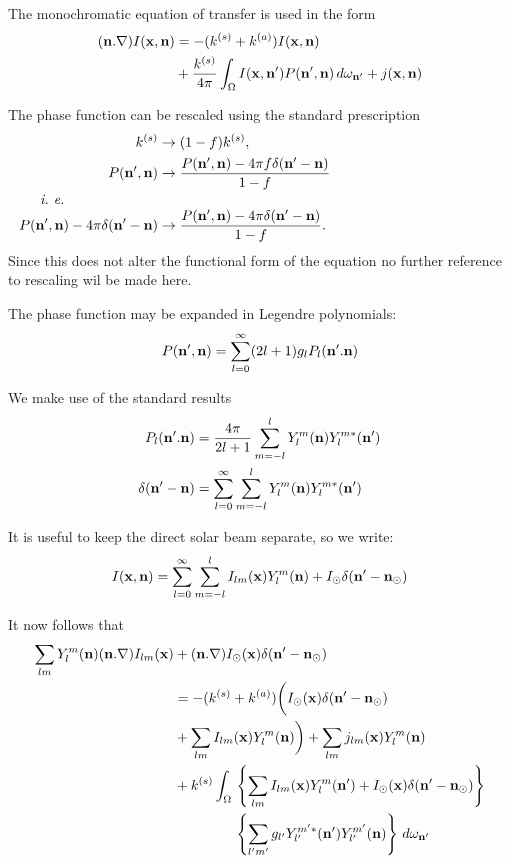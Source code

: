
The monochromatic equation of transfer is used in the form
\begin{equation}
\begin{split}
(\mathbf{n} . \nabla) I(\mathbf{x}, \mathbf{n}) & = -(k^{(s)} + k^{(a)}) I (\mathbf{x}, \mathbf{n}) \\
& + { k^{(s)} \over
{4 \pi} } \int_{\Omega} I(\mathbf{x},\mathbf{n}') P(\mathbf{n}', \mathbf{n}) \, d\omega_{\mathbf{n}'} 
+ j(\mathbf{x},\mathbf{n})
\end{split}
\end{equation}

The phase function can be rescaled using the standard prescription
\begin{align}
k^{(s)} & \rightarrow (1-f) k^{(s)}, \\
P(\bnp, \bn) & \rightarrow { {P(\bnp, \bn)-4\pi f \delta(\bnp - \bn)}
\over {1-f}} \\
\noalign{\text{\it i.~e.}}
P(\bnp, \bn)-4\pi \delta(\bnp - \bn) & \rightarrow 
{ {P(\bnp, \bn)-4\pi \delta(\bnp - \bn)}
\over {1-f}}.
\end{align}
Since this does not alter the functional form of the equation no further 
reference to rescaling wil be made here.

The phase function may be expanded in Legendre polynomials:
\begin{equation}
P(\mathbf{n}', \mathbf{n})= \sum_{l=0}^\infty (2l+1) g_l P_l (\mathbf{n}'.\mathbf{n})
\end{equation}

We make use of the standard results
\begin{align}
P_l (\mathbf{n}'.\mathbf{n}) &= { 4\pi \over {2l+1} } \sum_{m=-l}^l Y_l^m (\mathbf{n}) Y_l^{m*}
(\mathbf{n}') \\
\delta(\mathbf{n}' - \mathbf{n}) &= \sum_{l=0}^\infty \sum_{m=-l}^l Y_l^m (\mathbf{n}) Y_l^{m*}
(\mathbf{n}')
\end{align}

It is useful to keep the direct solar beam separate, so we write:
\begin{equation}
I(\mathbf{x},\mathbf{n}) = \sum_{l=0}^\infty \sum_{m=-l}^l I_{lm}(\mathbf{x}) Y_l^m (\mathbf{n})
+ I_\odot \delta(\mathbf{n}' - \mathbf{n}_\odot)
\end{equation}

It now follows that
\begin{equation}
\begin{split}
\sum_{lm} Y_l^m (\mathbf{n}) (\mathbf{n} . \nabla) I_{lm}(\mathbf{x}) &+ (\mathbf{n} . \nabla) 
I_\odot(\mathbf{x}) \delta(\mathbf{n}' - \mathbf{n}_\odot ) \\
&= - (k^{(s)} + k^{(a)} ) \biggl ( I_\odot(\mathbf{x}) \delta(\mathbf{n}' 
- \mathbf{n}_\odot ) \\
&+ \sum_{lm} I_{lm}(\mathbf{x}) Y_l^m (\mathbf{n}) \biggr )  + \sum_{lm} j_{lm}(\mathbf{x}) 
Y_l^m (\mathbf{n})\\
&+ k^{(s)} \int_\Omega  
\begin{aligned}[t]
& \left \{ \sum_{lm} I_{lm} (\mathbf{x}) 
Y_l^m (\mathbf{n}') + I_\odot(\mathbf{x}) \delta(\mathbf{n}' - \mathbf{n}_\odot ) 
\right \} \\
&\left \{ \sum_{l'm'} g_{l'} Y_{l'}^{m'*} (\mathbf{n}') Y_{l'}^{m'} (\mathbf{n}) \right \} \,
d\omega_{\mathbf{n}'}
\end{aligned}
\end{split}
\end{equation}

